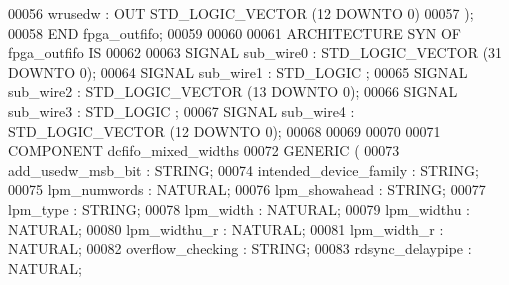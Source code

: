 \begin{DoxyCode}
{00056         \textcolor{vhdlchar}{wrusedw}     \textcolor{vhdlchar}{:} \textcolor{keywordflow}{OUT} \textcolor{comment}{STD\_LOGIC\_VECTOR} \textcolor{vhdlchar}{(}\textcolor{vhdllogic}{}\textcolor{vhdllogic}{12} \textcolor{keywordflow}{DOWNTO} \textcolor{vhdllogic}{}\textcolor{vhdllogic}{0}\textcolor{vhdlchar}{)}
00057     \textcolor{vhdlchar}{)};
00058 \textcolor{keywordflow}{END} \textcolor{vhdlchar}{fpga\_outfifo};
00059 
00060 
00061 \textcolor{keywordflow}{ARCHITECTURE} SYN \textcolor{keywordflow}{OF} fpga_outfifo IS
00062 
00063     \textcolor{keywordflow}{SIGNAL} \textcolor{vhdlchar}{sub_wire0}    \textcolor{vhdlchar}{:} \textcolor{comment}{STD\_LOGIC\_VECTOR} \textcolor{vhdlchar}{(}\textcolor{vhdllogic}{}\textcolor{vhdllogic}{31} \textcolor{keywordflow}{DOWNTO} \textcolor{vhdllogic}{}\textcolor{vhdllogic}{0}\textcolor{vhdlchar}{)};
00064     \textcolor{keywordflow}{SIGNAL} \textcolor{vhdlchar}{sub_wire1}    \textcolor{vhdlchar}{:} \textcolor{comment}{STD\_LOGIC} ;
00065     \textcolor{keywordflow}{SIGNAL} \textcolor{vhdlchar}{sub_wire2}    \textcolor{vhdlchar}{:} \textcolor{comment}{STD\_LOGIC\_VECTOR} \textcolor{vhdlchar}{(}\textcolor{vhdllogic}{}\textcolor{vhdllogic}{13} \textcolor{keywordflow}{DOWNTO} \textcolor{vhdllogic}{}\textcolor{vhdllogic}{0}\textcolor{vhdlchar}{)};
00066     \textcolor{keywordflow}{SIGNAL} \textcolor{vhdlchar}{sub_wire3}    \textcolor{vhdlchar}{:} \textcolor{comment}{STD\_LOGIC} ;
00067     \textcolor{keywordflow}{SIGNAL} \textcolor{vhdlchar}{sub_wire4}    \textcolor{vhdlchar}{:} \textcolor{comment}{STD\_LOGIC\_VECTOR} \textcolor{vhdlchar}{(}\textcolor{vhdllogic}{}\textcolor{vhdllogic}{12} \textcolor{keywordflow}{DOWNTO} \textcolor{vhdllogic}{}\textcolor{vhdllogic}{0}\textcolor{vhdlchar}{)};
00068 
00069 
00070 
00071     \textcolor{keywordflow}{COMPONENT} dcfifo\_mixed\_widths
00072     \textcolor{keywordflow}{GENERIC} (
00073         add\_usedw\_msb\_bit       : \textcolor{comment}{STRING};
00074         intended\_device\_family      : \textcolor{comment}{STRING};
00075         lpm\_numwords        : \textcolor{comment}{NATURAL};
00076         lpm\_showahead       : \textcolor{comment}{STRING};
00077         lpm\_type        : \textcolor{comment}{STRING};
00078         lpm\_width       : \textcolor{comment}{NATURAL};
00079         lpm\_widthu      : \textcolor{comment}{NATURAL};
00080         lpm\_widthu\_r        : \textcolor{comment}{NATURAL};
00081         lpm\_width\_r     : \textcolor{comment}{NATURAL};
00082         overflow\_checking       : \textcolor{comment}{STRING};
00083         rdsync\_delaypipe        : \textcolor{comment}{NATURAL};
}
\end{DoxyCode}
